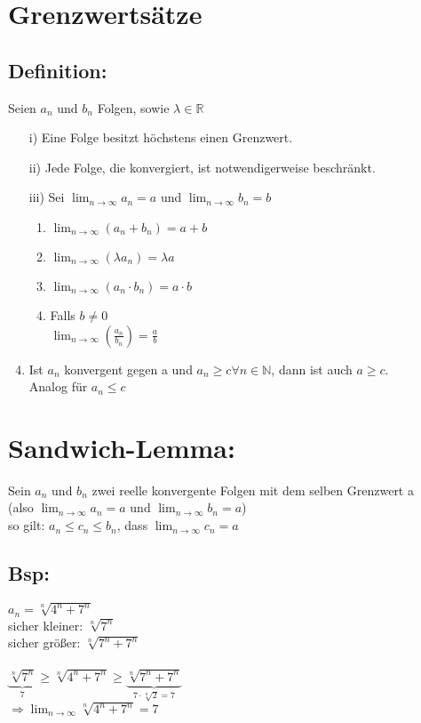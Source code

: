 \documentclass[../mainfile.tex]{subfiles}
\begin{document}
	
	\section{Grenzwertsätze}
	\subsection{Definition:}
		Seien $a_n$ und $b_n$ Folgen, sowie $\lambda \in \mathbb{R}$
		
		\begin{enumerate}
			\item[i)] Eine Folge besitzt höchstens einen Grenzwert. \\
			\item[ii)] Jede Folge, die konvergiert, ist notwendigerweise beschränkt.\\
			\item[iii)] Sei $\displaystyle \lim_{n\to\infty} a_n = a$ und $\displaystyle\lim_{n\to\infty} b_n = b$
			\begin{enumerate}[label=(\alph*)]
				\item $\displaystyle\lim_{n\to\infty} (a_n+b_n) = a+b$
				\item $\displaystyle\lim_{n\to\infty} (\lambda a_n) = \lambda a$
				\item $\displaystyle\lim_{n\to\infty} (a_n \cdot b_n) = a \cdot b$
				\item Falls $b\neq 0$ \\
				$\displaystyle\lim_{n\to\infty} (\frac{a_n}{b_n}) = \frac{a}{b}$
			\end{enumerate}
			\item Ist $a_n$ konvergent gegen a und $a_n \geqslant c \forall n \in \mathbb{N}$, dann ist auch $a \geqslant c$. \\
			Analog für $a_n \leqslant c$  
		\end{enumerate}
	
	\section{Sandwich-Lemma:} 
		Sein $a_n$ und $b_n$ zwei reelle konvergente Folgen mit dem selben Grenzwert a \\(also $\displaystyle \lim_{n\to\infty} a_n = a$ und $\displaystyle\lim_{n\to\infty} b_n = a$) \\
		so gilt: $a_n \leqslant c_n \leqslant b_n$, dass $\displaystyle\lim_{n\to\infty} c_n = a$ 
	\subsection*{Bsp:}
		$a_n = \sqrt[n]{4^n+7^n}$ \\  
		sicher kleiner: $\sqrt[n]{7^n}$ \\
		sicher größer: $\sqrt[n]{7^n+7^n}$ \\\\
		$\underbrace{\sqrt[n]{7^n}}_{\text{7}} \geqslant \sqrt[n]{4^n+7^n} \geqslant \underbrace{\sqrt[n]{7^n+7^n}}_{7 \cdot \sqrt[n]{2} = 7}$ \\
		$\Rightarrow \displaystyle\lim_{n\to\infty} \sqrt[n]{4^n+7^n} = 7$
		
\end{document}
